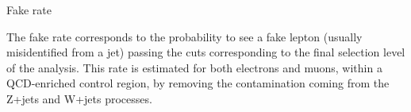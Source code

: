 \documentclass[8 pt]{beamer}
\begin{document}
\begin{frame}{Fake rate}

	\justifying
	The fake rate corresponds to the probability to see a fake lepton (usually misidentified from a jet) passing the cuts corresponding to the final selection level of the analysis. This rate is estimated for both electrons and muons, within a QCD-enriched control region, by removing the contamination coming from the Z+jets and W+jets processes. \vfill

\hspace{4pt}
   \begin{minipage}[c]{.02\linewidth}
	\begin{exampleblock}{}  \end{exampleblock}
   \end{minipage}	
   \hspace{5pt}	
	\begin{minipage}[c]{.48\linewidth}
   \end{minipage} \hfill
   \begin{minipage}[c]{.48\linewidth}
   \end{minipage} \hfill
   
   \vspace{-8pt}
   

\end{frame}
\end{document}
